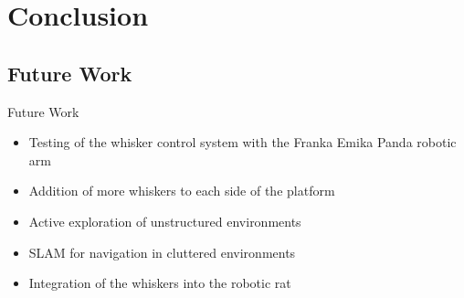 

\chapter{Conclusion}


\section{Future Work}
\begin{frame}{Future Work}
    \begin{itemize}
        \item Testing of the whisker control system with the Franka Emika Panda robotic arm
        \item Addition of more whiskers to each side of the platform
        \item Active exploration of unstructured environments
        \item SLAM for navigation in cluttered environments
        \item Integration of the whiskers into the robotic rat
    \end{itemize}
\end{frame}


